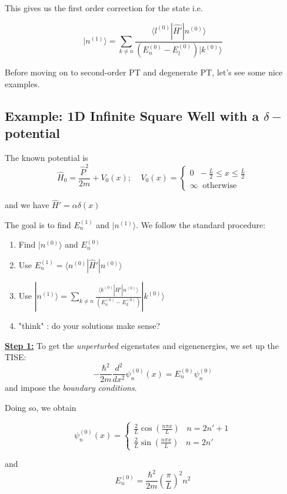 \documentclass{article}
\newcommand{\ket}[1]{|#1 \rangle}
\newcommand{\inner}[2]{\langle #1 | #2 \rangle}
\begin{document}
This gives us the first order correction for the state i.e.

\[ \boxed{ \ket{n^{(1)}} = \sum_{ k \neq n }  \frac{\inner{l^{(0)}}{\hat{H'} | n^{(0)}}}{ \left( E_n^{(0)} - E_l^{(0)} \right) \ket{k^{(0)}} } } \]


\vskip 0.5cm
Before moving on to second-order PT and degenerate PT, let's see some nice examples.

\vskip 1cm
\subsection{Example: 1D Infinite Square Well with a $\delta-$potential}

\vskip 0.5cm
The known potential is 
\[ \hat{H}_0 = \frac{\hat{P}^2}{2m} + V_0(x); \;\;\;\; V_0(x) = \begin{cases}
  0 \;\; -\frac{L}{2} \leq x \leq \frac{L}{2}\\
  \infty \;\;\text{otherwise}
\end{cases} \]

and we have $\hat{H}' = \alpha\delta(x)$

\vskip 0.5cm
The goal is to find $E_{n}^{(1)}$ and $\ket{n^{(1)}}$. We follow the standard procedure:
\begin{enumerate}
  \item Find $\ket{n^{(0)}}$ and $E_n^{(0)}$
  \item Use $E_n^{(1)} = \inner{n^{(0)}}{\hat{H}'|n^{(0)}}$
  \item Use $\ket{n^{(1)}} = \sum_{ k \neq n }  \frac{\inner{k^{(0)}}{\hat{H'} | n^{(0)}}}{ \left( E_n^{(0)} - E_k^{(0)} \right)} \ket{k^{(0)}}$
  \item "think" : do your solutions make sense?
\end{enumerate}

\vskip 1cm
\underline{\textbf{Step 1:}}
To get the \emph{unperturbed} eigenstates and eigenenergies, we set up the TISE:
\[ -\frac{\hbar^2}{2m} \frac{d^2}{dx^2} \psi_n^{(0)}(x) = E_n^{(0)} \psi_n^{(0)}  \]
and impose the \emph{boundary conditions}.

\vskip 1cm
Doing so, we obtain 

\[ \psi_n^{(0)}(x) = 
\begin{cases}
  \frac{2}{L} \cos\left( \frac{n\pi x}{L} \right) \;\;\;n = 2n' + 1 \\
  \frac{2}{L} \sin\left( \frac{n\pi x}{L} \right) \;\;\;n = 2n'
\end{cases} \]

and 
\[ E_n^{(0)} = \frac{\hbar^2}{2m}\left( \frac{\pi}{L} \right)^2 n^2 \]
\end{document}
